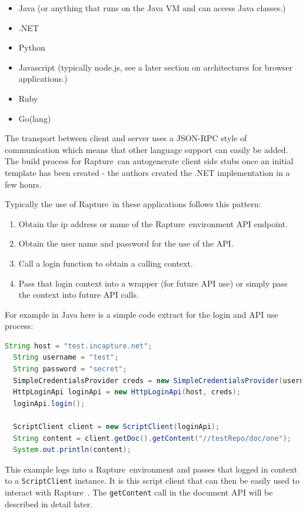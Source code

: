 \documentclass[12pt,twoside,a4paper]{article}
\newcommand{\Rapture}{Rapture~}
\begin{document}
\begin{itemize}
  \item{Java (or anything that runs on the Java VM and can access Java classes.)}
  \item{.NET}
  \item{Python}
  \item{Javascript (typically node.js, see a later section on architectures for browser applications.)}
  \item{Ruby}
  \item{Go(lang)}
\end{itemize}

The transport between client and server uses a JSON-RPC style of communication which
means that other language support can easily be added. The build process for
\Rapture can autogenerate client side stubs once an initial template has been
created - the authors created the .NET implementation in a few hours.

Typically the use of \Rapture in these applications follows this pattern:

\begin{enumerate}
  \item{Obtain the ip address or name of the \Rapture environment API endpoint.}
  \item{Obtain the user name and password for the use of the API.}
  \item{Call a login function to obtain a calling context.}
  \item{Pass that login context into a wrapper (for future API use) or simply pass the context into future API calls.}
\end{enumerate}

For example in Java here is a simple code extract for the login and API use process:

\begin{lstlisting}[caption={Java simple example}, language=Java]
  String host = "test.incapture.net";
  String username = "test";
  String password = "secret";
  SimpleCredentialsProvider creds = new SimpleCredentialsProvider(username, password);
  HttpLoginApi loginApi = new HttpLoginApi(host, creds);
  loginApi.login();

  ScriptClient client = new ScriptClient(loginApi);
  String content = client.getDoc().getContent("//testRepo/doc/one");
  System.out.println(content);
\end{lstlisting}

This example logs into a \Rapture environment and passes that logged in context to a \verb+ScriptClient+
instance. It is this script client that can then be easily used to interact with \Rapture. The
\verb+getContent+ call in the document API will be described in detail later.
\end{document}
